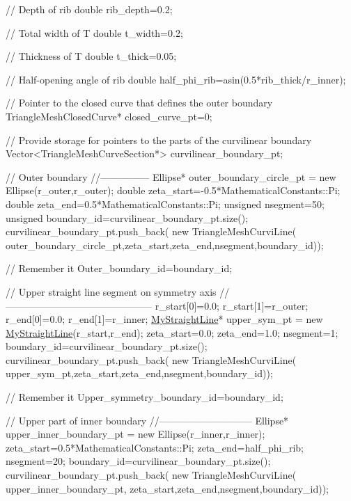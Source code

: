 \begin{DoxyCodeInclude}
 \textcolor{comment}{// Depth of rib}
 \textcolor{keywordtype}{double} rib\_depth=0.2;

 \textcolor{comment}{// Total width of T}
 \textcolor{keywordtype}{double} t\_width=0.2;

 \textcolor{comment}{// Thickness of T}
 \textcolor{keywordtype}{double} t\_thick=0.05;

 \textcolor{comment}{// Half-opening angle of rib}
 \textcolor{keywordtype}{double} half\_phi\_rib=asin(0.5*rib\_thick/r\_inner);

 \textcolor{comment}{// Pointer to the closed curve that defines the outer boundary}
 TriangleMeshClosedCurve* closed\_curve\_pt=0;
 
 \textcolor{comment}{// Provide storage for pointers to the parts of the curvilinear boundary}
 Vector<TriangleMeshCurveSection*> curvilinear\_boundary\_pt;

 \textcolor{comment}{// Outer boundary}
 \textcolor{comment}{//---------------}
 Ellipse* outer\_boundary\_circle\_pt = \textcolor{keyword}{new} Ellipse(r\_outer,r\_outer);
 \textcolor{keywordtype}{double} zeta\_start=-0.5*MathematicalConstants::Pi;
 \textcolor{keywordtype}{double} zeta\_end=0.5*MathematicalConstants::Pi;
 \textcolor{keywordtype}{unsigned} nsegment=50;
 \textcolor{keywordtype}{unsigned} boundary\_id=curvilinear\_boundary\_pt.size();
 curvilinear\_boundary\_pt.push\_back(
  \textcolor{keyword}{new} TriangleMeshCurviLine(
   outer\_boundary\_circle\_pt,zeta\_start,zeta\_end,nsegment,boundary\_id));

 \textcolor{comment}{// Remember it}
 Outer\_boundary\_id=boundary\_id;
 

 \textcolor{comment}{// Upper straight line segment on symmetry axis}
 \textcolor{comment}{//---------------------------------------------}
 r\_start[0]=0.0;
 r\_start[1]=r\_outer;
 r\_end[0]=0.0;
 r\_end[1]=r\_inner;
 \hyperlink{classMyStraightLine}{MyStraightLine}* upper\_sym\_pt = \textcolor{keyword}{new} \hyperlink{classMyStraightLine}{MyStraightLine}(r\_start,r\_end);
 zeta\_start=0.0;
 zeta\_end=1.0;
 nsegment=1;
 boundary\_id=curvilinear\_boundary\_pt.size();
 curvilinear\_boundary\_pt.push\_back(
  \textcolor{keyword}{new} TriangleMeshCurviLine(
   upper\_sym\_pt,zeta\_start,zeta\_end,nsegment,boundary\_id));
                                                        
 \textcolor{comment}{// Remember it}
 Upper\_symmetry\_boundary\_id=boundary\_id;
 
 \textcolor{comment}{// Upper part of inner boundary}
 \textcolor{comment}{//-----------------------------}
 Ellipse* upper\_inner\_boundary\_pt = 
  \textcolor{keyword}{new} Ellipse(r\_inner,r\_inner);
 zeta\_start=0.5*MathematicalConstants::Pi;
 zeta\_end=half\_phi\_rib;
 nsegment=20;
 boundary\_id=curvilinear\_boundary\_pt.size();
 curvilinear\_boundary\_pt.push\_back(
  \textcolor{keyword}{new} TriangleMeshCurviLine(
   upper\_inner\_boundary\_pt,
   zeta\_start,zeta\_end,nsegment,boundary\_id));


\end{DoxyCodeInclude}
